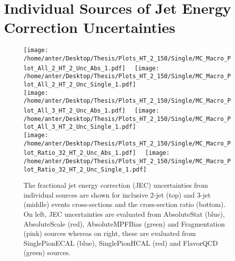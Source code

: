 \section{Individual Sources of Jet Energy Correction Uncertainties}
\label{sec:JECs}

\begin{figure}[!hbtp]
\hspace*{-5mm}\texttt{[image: /home/anter/Desktop/Thesis/Plots\_HT\_2\_150/Single/MC\_Macro\_Plot\_All\_2\_HT\_2\_Unc\_Abs\_1.pdf]}%
~~\texttt{[image: /home/anter/Desktop/Thesis/Plots\_HT\_2\_150/Single/MC\_Macro\_Plot\_All\_2\_HT\_2\_Unc\_Single\_1.pdf]}\\
\hspace*{-5mm}\texttt{[image: /home/anter/Desktop/Thesis/Plots\_HT\_2\_150/Single/MC\_Macro\_Plot\_All\_3\_HT\_2\_Unc\_Abs\_1.pdf]}%
~~\texttt{[image: /home/anter/Desktop/Thesis/Plots\_HT\_2\_150/Single/MC\_Macro\_Plot\_All\_3\_HT\_2\_Unc\_Single\_1.pdf]}\\
\hspace*{-5mm}\texttt{[image: /home/anter/Desktop/Thesis/Plots\_HT\_2\_150/Single/MC\_Macro\_Plot\_Ratio\_32\_HT\_2\_Unc\_Abs\_1.pdf]}%
~~\texttt{[image: /home/anter/Desktop/Thesis/Plots\_HT\_2\_150/Single/MC\_Macro\_Plot\_Ratio\_32\_HT\_2\_Unc\_Single\_1.pdf]}
\caption[The fractional jet energy correction (JEC) uncertainties from individual sources (Part I).]{The fractional jet energy correction (JEC) uncertainties from individual sources are shown for inclusive 2-jet (top) and 3-jet (middle) events cross-sections and the cross-section ratio \ratio (bottom). On left, JEC uncertainties are evaluated from AbsoluteStat (blue), AbsoluteScale (red), AbsoluteMPFBias (green) and Fragmentation (pink) sources whereas on right, these are evaluated from SinglePionECAL (blue), SinglePionHCAL (red) and FlavorQCD (green) sources.}
\label{fig:jes1}
\end{figure}

